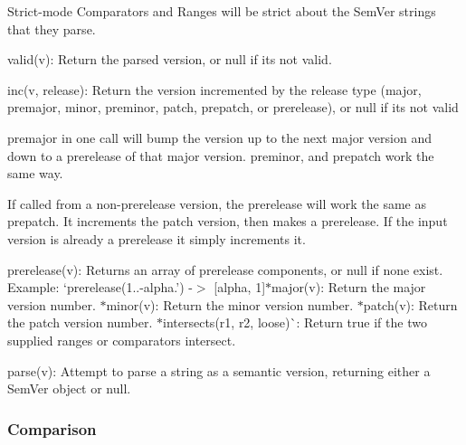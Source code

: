 Strict-\/mode Comparators and Ranges will be strict about the Sem\+Ver strings that they parse.


\begin{DoxyItemize}
\item {\ttfamily valid(v)}\+: Return the parsed version, or null if it\textquotesingle{}s not valid.
\item {\ttfamily inc(v, release)}\+: Return the version incremented by the release type ({\ttfamily major}, {\ttfamily premajor}, {\ttfamily minor}, {\ttfamily preminor}, {\ttfamily patch}, {\ttfamily prepatch}, or {\ttfamily prerelease}), or null if it\textquotesingle{}s not valid
\begin{DoxyItemize}
\item {\ttfamily premajor} in one call will bump the version up to the next major version and down to a prerelease of that major version. {\ttfamily preminor}, and {\ttfamily prepatch} work the same way.
\item If called from a non-\/prerelease version, the {\ttfamily prerelease} will work the same as {\ttfamily prepatch}. It increments the patch version, then makes a prerelease. If the input version is already a prerelease it simply increments it.
\end{DoxyItemize}
\item {\ttfamily prerelease(v)}\+: Returns an array of prerelease components, or null if none exist. Example\+: `prerelease(\textquotesingle{}1..-\/alpha.') -\/$>$ \mbox{[}\textquotesingle{}alpha\textquotesingle{}, 1\mbox{]}{\ttfamily  $\ast$}major(v){\ttfamily \+: Return the major version number. $\ast$}minor(v){\ttfamily \+: Return the minor version number. $\ast$}patch(v){\ttfamily \+: Return the patch version number. $\ast$}intersects(r1, r2, loose)\`{}\+: Return true if the two supplied ranges or comparators intersect.
\item {\ttfamily parse(v)}\+: Attempt to parse a string as a semantic version, returning either a {\ttfamily Sem\+Ver} object or {\ttfamily null}.
\end{DoxyItemize}

\subsubsection*{Comparison}


